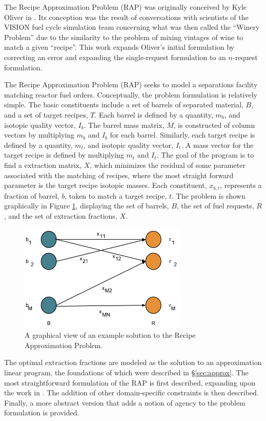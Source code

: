 The Recipe Approximation Problem (RAP) was originally conceived by Kyle Oliver
in \cite{oliver_geniusv2:_2009}. Its conception was the result of conversations
with scientists of the VISION fuel cycle simulation team \cite{vision2009}
concerning what was then called the ``Winery Problem'' due to the similarity to
the problem of mixing vintages of wine to match a given ``recipe''. This work
expands Oliver's initial formulation by correcting an error and expanding the
single-request formulation to an $n$-request formulation.

The Recipe Approximation Problem (RAP) seeks to model a separations facility
matching reactor fuel orders. Conceptually, the problem formulation is
relatively simple. The basic constituents include a set of barrels of separated
material, $B$, and a set of target recipes, $T$. Each barrel is defined by a
quantity, $m_b$, and isotopic quality vector, $I_b$. The barrel mass matrix,
$M$, is constructed of column vectors by multiplying $m_b$ and $I_b$ for each
barrel. Similarly, each target recipe is defined by a quantity, $m_t$, and
isotopic quality vector, $I_t$. A mass vector for the target recipe is defined
by multiplying $m_t$ and $I_t$. The goal of the program is to find a extraction
matrix, $X$, which minimizes the residual of some parameter associated with the
matching of recipes, where the most straight forward parameter is the target
recipe isotopic masses. Each constituent, $x_{b,t}$, represents a fraction of
barrel, $b$, taken to match a target recipe, $t$. The problem is shown
graphically in Figure \ref{fig:rap}, displaying the set of barrels, $B$, the set
of fuel requests, $R$, and the set of extraction fractions, $X$.

\begin{figure}[h]
  \begin{center}
    \includegraphics[width=8cm]{./chapters/research/rap.png}
  \caption{A graphical view of an example solution to the Recipe Approximation 
           Problem.}
  \label{fig:rap}
  \end{center}
\end{figure}

The optimal extraction fractions are modeled as the solution to an approximation
linear program, the foundations of which were described in
\S\ref{sec:approx}. The most straightforward formulation of the RAP is first
described, expanding upon the work in \cite{oliver_geniusv2:_2009}. The addition
of other domain-specific constraints is then described. Finally, a more abstract
version that adds a notion of agency to the problem formulation is provided.
